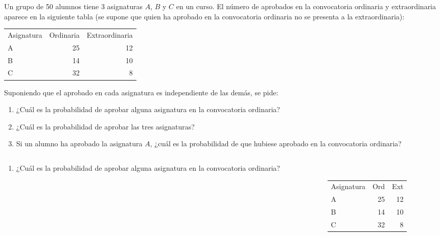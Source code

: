 \documentclass[aspectratio=149,10pt,xcolor=dvipsnames,t]{beamer}
\begin{document}
\begin{frame}[c]
Un grupo de 50 alumnos tiene 3 asignaturas $A$, $B$ y $C$ en un curso. 
El número de aprobados en la convocatoria ordinaria y extraordinaria aparece en la siguiente tabla (se supone que quien
ha aprobado en la convocatoria ordinaria no se presenta a la extraordinaria):
\begin{center}
\begin{tabular}{lrr}
\hline
Asignatura & Ordinaria & Extraordinaria\\
A & 25 & 12\\
B & 14 & 10\\
C & 32 & 8\\
\hline
\end{tabular}
\end{center}
Suponiendo que el aprobado en cada asignatura es independiente de las demás, se pide:
\begin{enumerate}
\item ¿Cuál es la probabilidad de aprobar alguna asignatura en la convocatoria ordinaria?
\item ¿Cuál es la probabilidad de aprobar las tres asignaturas?
\item Si un alumno ha aprobado la asignatura $A$, ¿cuál es la probabilidad de que hubiese aprobado en la convocatoria ordinaria?
\end{enumerate}
\end{frame}


\begin{frame}
\begin{columns}
\begin{column}[T]{0.65\textwidth}
\begin{enumerate}
\item ¿Cuál es la probabilidad de aprobar alguna asignatura en la convocatoria ordinaria?
\end{enumerate}
\end{column}
\begin{column}[T]{0.35\textwidth}
\\

\medskip
\begin{tabular}{lrr}
\hline
Asignatura & Ord & Ext\\
A & 25 & 12\\
B & 14 & 10\\
C & 32 & 8\\
\hline
\end{tabular}
\end{column}
\end{columns}
\end{frame}
\end{document}
